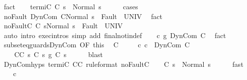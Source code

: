 \begin{isabellebody}
\ fact\isanewline
\ \ \isamarkupfalse%
\ termi{\isacharunderscore}C{\isacharprime}{\isacharcolon}\ {\isachardoublequoteopen}{\isasymGamma}{\isasymturnstile}C{\isacharprime}\ s\ {\isasymdown}\ Normal\ s{\isachardoublequoteclose}\isanewline
\ \ \ \ \isamarkupfalse%
\ cases\isanewline
\ \ \isamarkupfalse%
\ noFault{\isacharcolon}\ {\isachardoublequoteopen}{\isasymGamma}{\isasymturnstile}{\isasymlangle}DynCom\ C{\isacharprime}{\isacharcomma}Normal\ s\ {\isasymrangle}\ {\isasymRightarrow}{\isasymnotin}Fault\ {\isacharbackquote}\ UNIV{\isachardoublequoteclose}\ \isamarkupfalse%
\ fact\isanewline
\ \ \isamarkupfalse%
\ noFault{\isacharunderscore}C{\isacharprime}{\isacharcolon}\ {\isachardoublequoteopen}{\isasymGamma}{\isasymturnstile}{\isasymlangle}C{\isacharprime}\ s{\isacharcomma}Normal\ s\ {\isasymrangle}\ {\isasymRightarrow}{\isasymnotin}Fault\ {\isacharbackquote}\ UNIV{\isachardoublequoteclose}\isanewline
\ \ \ \ \isamarkupfalse%
\ {\isacharparenleft}auto\ intro{\isacharcolon}\ exec{\isachardot}intros\ simp\ add{\isacharcolon}\ final{\isacharunderscore}notin{\isacharunderscore}def{\isacharparenright}\isanewline
\ \ \isamarkupfalse%
\ {\isachardoublequoteopen}c\ {\isasymsubseteq}\isactrlsub g\ DynCom\ C{\isacharprime}{\isachardoublequoteclose}\ \isamarkupfalse%
\ fact\isanewline
\ \ \isamarkupfalse%
\ subseteq{\isacharunderscore}guards{\isacharunderscore}DynCom\ {\isacharbrackleft}OF\ this{\isacharbrackright}\ \isamarkupfalse%
\ C\ \isanewline
\ \ \ \ c{\isacharcolon}\ {\isachardoublequoteopen}c\ {\isacharequal}\ DynCom\ C{\isachardoublequoteclose}\ \isanewline
\ \ \ \ C{\isacharunderscore}C{\isacharprime}{\isacharcolon}\ {\isachardoublequoteopen}{\isasymforall}s{\isachardot}\ C\ s\ {\isasymsubseteq}\isactrlsub g\ C{\isacharprime}\ s{\isachardoublequoteclose}\isanewline
\ \ \ \ \isamarkupfalse%
\ blast\isanewline
\ \ \isamarkupfalse%
\ DynCom{\isachardot}hyps\ termi{\isacharunderscore}C{\isacharprime}\ C{\isacharunderscore}C{\isacharprime}\ {\isacharbrackleft}rule{\isacharunderscore}format{\isacharbrackright}\ noFault{\isacharunderscore}C{\isacharprime}\isanewline
\ \ \isamarkupfalse%
\ {\isachardoublequoteopen}{\isasymGamma}{\isasymturnstile}C\ s\ {\isasymdown}\ Normal\ s{\isachardoublequoteclose}\isanewline
\ \ \ \ \isamarkupfalse%
\ fast\isanewline
\ \ \isamarkupfalse%
\ c\ \isamarkupfalse%

\end{isabellebody}
